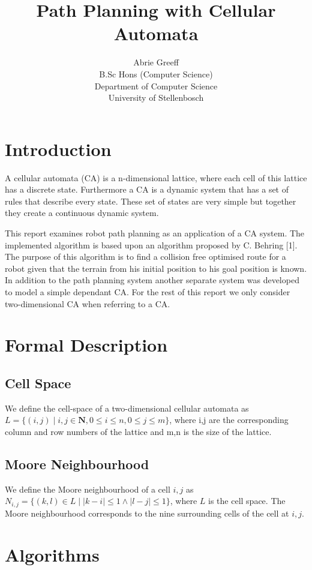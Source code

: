 \documentclass[a4paper,11pt,titlepage]{article}
\author{Abrie Greeff\\B.Sc Hons (Computer Science)\\Department of Computer Science\\University of Stellenbosch}
\title{Path Planning with Cellular Automata}
\begin{document}
\maketitle
\section{Introduction}
A cellular automata (CA) is a n-dimensional lattice, where each cell of this lattice has a discrete state. Furthermore a CA is a dynamic system that has a set of rules that describe every state. These set of states are very simple but together they create a continuous dynamic system.

This report examines robot path planning as an application of a CA system. The implemented algorithm is based upon an algorithm proposed by C. Behring [1]. The purpose of this algorithm is to find a collision free optimised route for a robot given that the terrain from his initial position to his goal position is known. In addition to the path planning system another separate system was developed to model a simple dependant CA. For the rest of this report we only consider two-dimensional CA when referring to a CA.
\section {Formal Description}
\subsection {Cell Space}
We define the cell-space of a two-dimensional cellular automata as $L= \lbrace (i,j) \mid i,j \in \mathbf{N},0 \leq i \leq n,0\leq j \leq m \rbrace$, where i,j are the corresponding column and row numbers of the lattice and m,n is the size of the lattice.
\subsection {Moore Neighbourhood}
We define the Moore neighbourhood of a cell $i,j$ as
$N_{i,j}=\lbrace (k,l) \in L \mid |k-i| \leq 1 \wedge |l-j| \leq 1\rbrace$, where $L$ is the cell space. The Moore neighbourhood corresponds to the nine surrounding cells of the cell at $i,j$.
\section{Algorithms}
\end{document}
